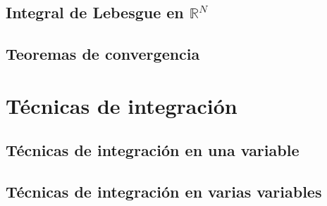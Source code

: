 \documentclass[11pt,spanish]{article} %
\begin{document}
\subsection{Integral de Lebesgue en $\mathbb{R}^N$}

\subsection{Teoremas de convergencia}

\newpage
\section{T\'ecnicas de integraci\'on}
\subsection{T\'ecnicas de integraci\'on en una variable}
	
\subsection{T\'ecnicas de integraci\'on en varias variables}


\end{document}
